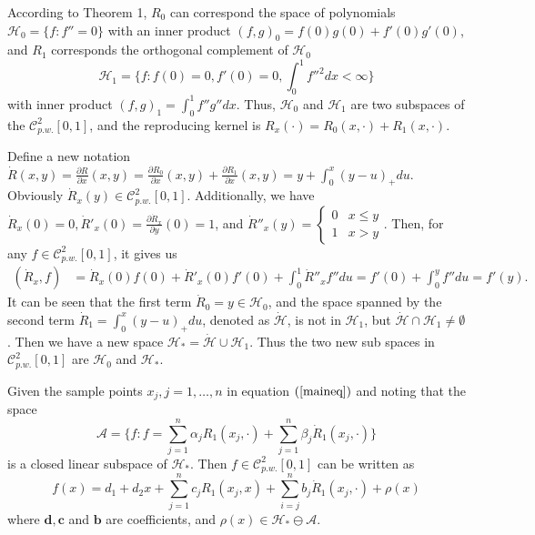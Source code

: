According to Theorem 1, $R_0$ can correspond the space of polynomials $\mathcal{H}_0=\{f:f''=0\}$ with an inner product $(f,g)_0= f(0)g(0)+f'(0)g'(0)$, and $R_1$ corresponds the orthogonal complement of $\mathcal{H}_0$
\begin{equation*}
\mathcal{H}_1=\{f:f(0)=0, f'(0)=0, \int_{0}^{1}f''^2dx<\infty\}
\end{equation*}
with inner product $(f,g)_1=\int_{0}^{1}f''g''dx$. Thus, $\mathcal{H}_0$ and $\mathcal{H}_1$ are two subspaces of the $\mathcal{C}_{p.w.}^{2}[0,1]$, and the reproducing kernel is $R_x(\cdot) = R_0(x,\cdot)+R_1(x,\cdot)$.

Define a new notation $\dot{R}(x,y)=\frac{\partial R}{\partial x}(x,y)=\frac{\partial R_0}{\partial x}(x,y)+\frac{\partial R_1}{\partial x}(x,y)=y+\int_0^x(y-u)_+du$. Obviously $\dot{R}_x(y) \in \mathcal{C}_{p.w.}^{2}[0,1]$. Additionally, we have $\dot{R}_x(0)=0, \dot{R}'_x(0)=\frac{\partial \dot{R}_x}{\partial y}(0)=1$, and $ \dot{R}''_x(y)=\begin{cases}
0 & x\leq y \\ 1 & x>y \end{cases}$. Then, for any $f\in \mathcal{C}_{p.w.}^{2}[0,1]$, it gives us 
\begin{align*}
(\dot{R}_x,f) &=\dot{R}_x(0)f(0)+\dot{R}'_x(0)f'(0)+\int_0^1\dot{R}''_x f''	 du=f'(0)+\int_0^y f''du=f'(y).
\end{align*}
It can be seen that the first term $\dot{R}_0=y\in \mathcal{H}_0$, and the space spanned by the second term  $\dot{R}_1=\int_0^x(y-u)_+du$, denoted as $\mathcal{\dot{H}}$, is not in $\mathcal{H}_1$, but $\mathcal{\dot{H}} \cap \mathcal{H}_1\neq \emptyset$. Then we have a new space $\mathcal{H}_*=\mathcal{\dot{H}} \cup \mathcal{H}_1$. Thus the two new sub spaces in $\mathcal{C}_{p.w.}^2[0,1]$ are $\mathcal{H}_0$ and $\mathcal{H}_*$.



Given the sample points $x_j, j=1, \ldots, n$ in equation $(\ref{maineq})$ and noting that the space
\begin{equation}
\mathcal{A}=\{f: f=\sum_{j=1}^{n}\alpha_jR_1(x_j,\cdot)+\sum_{j=1}^{n}\beta_j\dot{R}_1(x_j,\cdot)\} 
\end{equation}
is a closed linear subspace of $\mathcal{H}_*$. Then $f  \in \mathcal{C}_{p.w.}^2[0,1]$ can be written as
\begin{equation}\label{etaeq}
f(x)=d_1+d_2x+\sum_{j=1}^{n}c_jR_1(x_j,x)+\sum_{i=j}^{n}b_j\dot{R}_1(x_j,\cdot) +\rho(x)
\end{equation}
where $\mathbf{d},\mathbf{c}$ and $\mathbf{b}$ are coefficients, and $\rho(x) \in \mathcal{H}_* \ominus \mathcal{A}$. 

